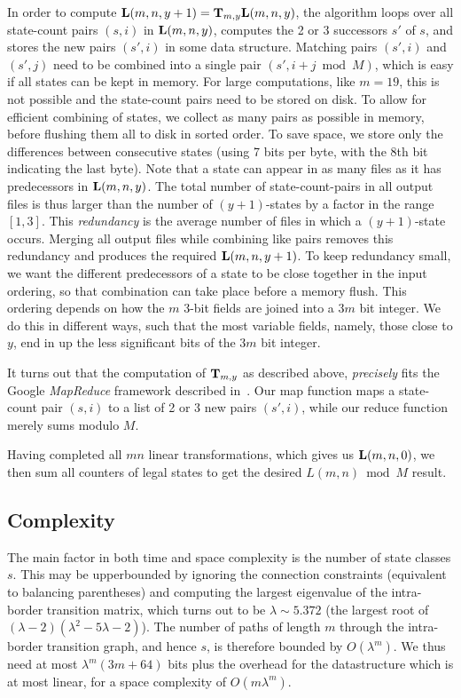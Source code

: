 \documentclass{article}
\begin{document}
In order to compute $\mathbf{L}(m,n,y+1) = \mathbf{T}_{m,y} \mathbf{L}(m,n,y)$,
the algorithm loops over all state-count pairs $(s,i)$ in $\mathbf{L}(m,n,y)$,
computes the 2 or 3 successors $s'$ of $s$, and stores the new pairs
$(s',i)$ in some data structure.
Matching pairs $(s',i)$ and $(s',j)$ need to be combined into a single
pair $(s',i+j \bmod M)$, which is easy if all states can be kept in memory.
For large computations, like $m=19$, this is not possible and the
state-count pairs need to be stored on disk. To allow for efficient combining
of states, we collect as many pairs as possible in memory, before flushing
them all to disk in sorted order. To save space, we store only the differences
between consecutive states (using 7 bits per byte, with
the 8th bit indicating the last byte).
Note that a state can appear in as many files as it has
predecessors in $\mathbf{L}(m,n,y)$.
The total number of state-count-pairs in all output files is thus
larger than the number of $(y+1)$-states by a factor in the range $[1,3]$.
This {\em redundancy} is the average number of files in which
a $(y+1)$-state occurs. Merging all output files while combining like pairs
removes this redundancy and produces the required $\mathbf{L}(m,n,y+1)$.
To keep redundancy small, we want
the different predecessors of a state to be close together
in the input ordering, so that combination can take place before
a memory flush.
This ordering depends on how the $m$ 3-bit fields are joined into a
$3m$ bit integer. We do this in different ways, such that the most variable
fields, namely, those close to $y$, end in up the less significant
bits of the $3m$ bit integer.

It turns out that the computation of $\mathbf{T}_{m,y}$ as described above,
{\em precisely} fits the Google {\em MapReduce} framework described
in~\cite{DG04}. Our map function maps a state-count pair $(s,i)$ to a
list of 2 or 3 new pairs $(s',i)$, while our reduce function merely
sums modulo $M$.

Having completed all $mn$ linear transformations,
which gives us $\mathbf{L}(m,n,0)$, we then sum all counters of legal
states to get the desired $L(m,n) \bmod M$ result.

\subsection{Complexity}
The main factor in both time and space complexity is the number of
state classes $s$. This may be upperbounded by ignoring the
connection constraints (equivalent to balancing parentheses) and
computing the largest eigenvalue of the intra-border transition matrix,
which turns out to be $\lambda \sim 5.372$ (the largest root
of $(\lambda-2)(\lambda^2-5\lambda-2)$). The number of paths
of length $m$ through the intra-border transition graph, and hence $s$,
is therefore bounded by $O(\lambda^m)$. 
We thus need at most $\lambda^m(3m+64)$ bits plus the
overhead for the datastructure which is at most linear,
for a space complexity of $O(m \lambda^m)$.
\end{document}
